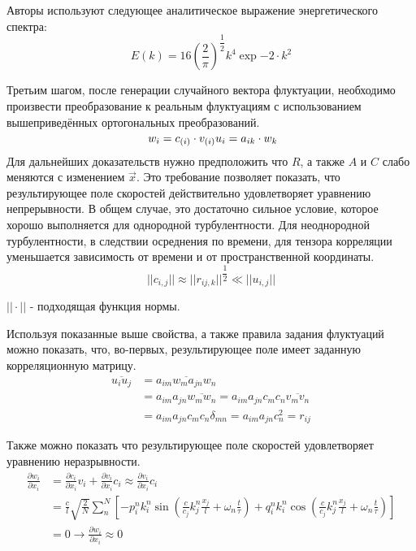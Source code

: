 Авторы используют следующее аналитическое выражение энергетического спектра:
\begin{equation}
    \label{eq:spectral_equation9}
    E(k) = 16 (\frac{2}{\pi})^{\dfrac{1}{2}} k^4 \exp{-2 \cdot k^2}
\end{equation}

Третьим шагом, после генерации случайного вектора флуктуации, необходимо произвести преобразование к реальным флуктуациям с использованием вышеприведённых ортогональных преобразований.
\begin{equation}
    \label{eq:spectral_equation10}\
    w_i = c_{\left( i \right)} \cdot v_{\left( i \right)} \\
    u_i = a_{ik} \cdot w_k
\end{equation}
Для дальнейших доказательств нужно предположить что $R$, а также $A$ и $C$ слабо меняются с изменением $\vec x$. Это требование позволяет показать, что результирующее поле скоростей действительно удовлетворяет уравнению непрерывности. В общем случае, это достаточно сильное условие, которое хорошо выполняется для однородной турбулентности. Для неоднородной турбулентности, в следствии осреднения по времени, для тензора корреляции уменьшается зависимость от времени и от пространственной координаты. 
\begin{equation}
    \label{eq:spectral_equation11}
    ||c_{i, j}|| \approx || r_{ij, k} || ^ {\dfrac{1}{2}} \ll || u_{i, j} ||
\end{equation}

$||\cdot||$ - подходящая функция нормы.

Используя показанные выше свойства, а также правила задания флуктуаций можно показать, что, во-первых, результирующее поле имеет заданную корреляционную матрицу.
\begin{align}
    \label{eq:spectral_equation12}
    \overline{u_i u_j} & = \overline{a_{im} w_m a_{jn} w_n} \nonumber \\
    & = a_{im} a_{jn} \overline{w_m w_n} = a_{im} a_{jn} c_m c_n \overline{v_m v_n} \nonumber \\
    & = a_{im} a_{jn} c_m c_n \delta_{mn} = a_{im} a_{jn} c_n^2 = r_{ij}
\end{align}

Также можно показать что результирующее поле скоростей удовлетворяет уравнению неразрывности. 
\begin{align}
    \label{eq:spectral_equation13}
    \frac{\partial w_i}{\partial x_i} & = \frac{\partial c_i}{\partial x_i} v_i + \frac{\partial v_i}{ \partial x_i} c_i \approx \frac{\partial v_i}{ \partial x_i} c_i \nonumber \\ 
    & = \frac{c}{l} \sqrt{\frac{2}{N}} \sum_n^N \left[ -p_i^n k_i^n \sin{(\frac{c}{c_j} k_j^n \frac{x_j}{l} + \omega_n \frac{t}{\tau})} + q_i^n k_i^n \cos{(\frac{c}{c_j} k_j^n \frac{x_j}{l} + \omega_n \frac{t}{\tau})} \right] \nonumber \\ 
    & = 0 \rightarrow \frac{\partial w_i}{\partial x_i} \approx 0
\end{align}

